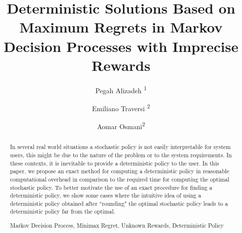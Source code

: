 \documentclass[runningheads,a4paper]{llncs}
\newcommand{\up}[1]{\textsuperscript{#1}}
\newcommand{\keywords}[1]{\par\addvspace\baselineskip
\noindent\keywordname\enspace\ignorespaces#1}
\begin{document}
\mainmatter  %

\title{Deterministic Solutions Based on Maximum Regrets in Markov Decision Processes with Imprecise Rewards}


%
%

\author{Pegah Alizadeh \up{1} \and Emiliano Traversi \up{2} \and Aomar Osmani\up{2}}

%



%
%

\maketitle


\begin{abstract}
In several real world situations a stochastic policy is not easily interpretable for system users, this might be due to the nature of the problem or to the system requirements. In these contexts, it is inevitable to provide a deterministic policy to the user. In this paper, we propose an exact method for computing a deterministic policy in reasonable computational overhead in comparison to the required time for computing the optimal stochastic policy. To better motivate the use of an exact procedure for finding a deterministic policy, we show some cases where the intuitive idea of using a deterministic policy obtained after ``rounding" the optimal stochastic policy leads to a deterministic policy far from the optimal.
\keywords{Markov Decision Process, Minimax Regret, Unknown Rewards, Deterministic Policy}
\end{abstract}
\end{document}
